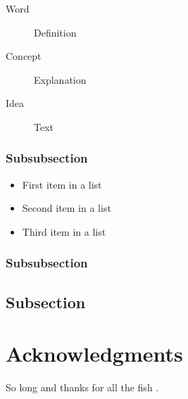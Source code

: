\documentclass[fleqn,10pt]{SelfArx}
\begin{document}
\lipsum[12] %

\begin{description}
	\item[Word] Definition
	\item[Concept] Explanation
	\item[Idea] Text
\end{description}

\subsubsection{Subsubsection}

\lipsum[13] %

\begin{itemize}[noitemsep] %
	\item First item in a list
	\item Second item in a list
	\item Third item in a list
\end{itemize}

\subsubsection{Subsubsection}

\lipsum[14] %

\subsection{Subsection}

\lipsum[15-23] %


\section*{Acknowledgments} %


So long and thanks for all the fish \cite{Figueredo:2009dg, Smith:2012qr}.





\end{document}
